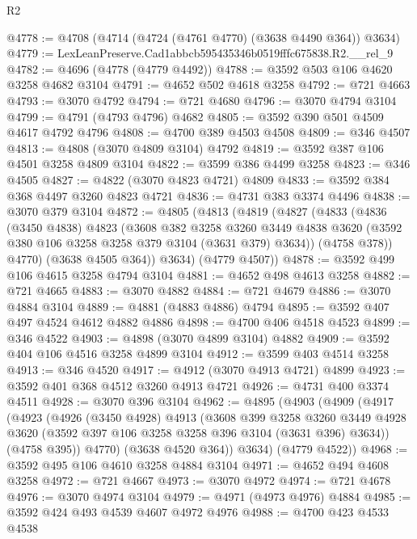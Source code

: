 \begin{lexlean}{R2}
\begin{coremodule}
@4778 := @4708 (@4714 (@4724 (@4761 @4770) (@3638 @4490 @364)) @3634)
@4779 := LexLeanPreserve.Cad1abbcb595435346b0519fffc675838.R2.__rel_9
@4782 := @4696 (@4778 (@4779 @4492))
@4788 := @3592 @503 @106 @4620 @3258 @4682 @3104
@4791 := @4652 @502 @4618 @3258
@4792 := @721 @4663
@4793 := @3070 @4792
@4794 := @721 @4680
@4796 := @3070 @4794 @3104
@4799 := @4791 (@4793 @4796) @4682
@4805 := @3592 @390 @501 @4509 @4617 @4792 @4796
@4808 := @4700 @389 @4503 @4508
@4809 := @346 @4507
@4813 := @4808 (@3070 @4809 @3104) @4792
@4819 := @3592 @387 @106 @4501 @3258 @4809 @3104
@4822 := @3599 @386 @4499 @3258
@4823 := @346 @4505
@4827 := @4822 (@3070 @4823 @4721) @4809
@4833 := @3592 @384 @368 @4497 @3260 @4823 @4721
@4836 := @4731 @383 @3374 @4496
@4838 := @3070 @379 @3104
@4872 := @4805
    (@4813
      (@4819
        (@4827
          (@4833
            (@4836
              (@3450 @4838)
              @4823
              (@3608
                @382
                @3258
                @3260
                @3449
                @4838
                @3620
                (@3592 @380 @106 @3258 @3258 @379 @3104 (@3631 @379) @3634))
              (@4758 @378))
            @4770)
          (@3638 @4505 @364))
        @3634)
      (@4779 @4507))
@4878 := @3592 @499 @106 @4615 @3258 @4794 @3104
@4881 := @4652 @498 @4613 @3258
@4882 := @721 @4665
@4883 := @3070 @4882
@4884 := @721 @4679
@4886 := @3070 @4884 @3104
@4889 := @4881 (@4883 @4886) @4794
@4895 := @3592 @407 @497 @4524 @4612 @4882 @4886
@4898 := @4700 @406 @4518 @4523
@4899 := @346 @4522
@4903 := @4898 (@3070 @4899 @3104) @4882
@4909 := @3592 @404 @106 @4516 @3258 @4899 @3104
@4912 := @3599 @403 @4514 @3258
@4913 := @346 @4520
@4917 := @4912 (@3070 @4913 @4721) @4899
@4923 := @3592 @401 @368 @4512 @3260 @4913 @4721
@4926 := @4731 @400 @3374 @4511
@4928 := @3070 @396 @3104
@4962 := @4895
    (@4903
      (@4909
        (@4917
          (@4923
            (@4926
              (@3450 @4928)
              @4913
              (@3608
                @399
                @3258
                @3260
                @3449
                @4928
                @3620
                (@3592 @397 @106 @3258 @3258 @396 @3104 (@3631 @396) @3634))
              (@4758 @395))
            @4770)
          (@3638 @4520 @364))
        @3634)
      (@4779 @4522))
@4968 := @3592 @495 @106 @4610 @3258 @4884 @3104
@4971 := @4652 @494 @4608 @3258
@4972 := @721 @4667
@4973 := @3070 @4972
@4974 := @721 @4678
@4976 := @3070 @4974 @3104
@4979 := @4971 (@4973 @4976) @4884
@4985 := @3592 @424 @493 @4539 @4607 @4972 @4976
@4988 := @4700 @423 @4533 @4538

\end{coremodule}
\end{lexlean}
